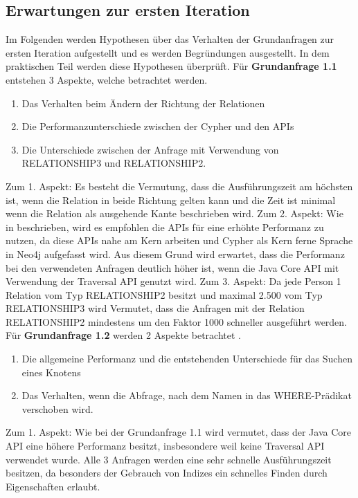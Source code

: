 \subsection{Erwartungen zur ersten Iteration}
Im Folgenden werden Hypothesen über das Verhalten der Grundanfragen zur ersten Iteration aufgestellt und es werden  Begründungen ausgestellt. In dem praktischen Teil werden diese Hypothesen überprüft. \newline \newline
Für \textbf{Grundanfrage 1.1} entstehen 3 Aspekte, welche betrachtet werden.
\begin{enumerate}
\item Das Verhalten beim Ändern der Richtung der Relationen
\item Die Performanzunterschiede zwischen der Cypher und den APIs
\item Die Unterschiede zwischen der Anfrage mit Verwendung von RELATIONSHIP3 und RELATIONSHIP2.
\end{enumerate}
Zum 1. Aspekt: Es besteht die Vermutung, dass die Ausführungszeit am höchsten ist, wenn die Relation in beide Richtung gelten kann und die Zeit ist minimal wenn die Relation als ausgehende Kante beschrieben wird. \newline
 Zum 2. Aspekt: Wie in \parencite{raj2015neo4j} beschrieben, wird es empfohlen die APIs für eine erhöhte Performanz zu nutzen, da diese APIs nahe am Kern arbeiten und Cypher als Kern ferne Sprache in Neo4j aufgefasst wird. Aus diesem Grund wird erwartet, dass die Performanz bei den verwendeten Anfragen deutlich höher ist, wenn die Java Core API mit Verwendung der Traversal API genutzt wird. \newline
Zum 3. Aspekt: Da jede Person 1 Relation vom Typ RELATIONSHIP2 besitzt und maximal 2.500 vom Typ RELATIONSHIP3 wird Vermutet, dass die Anfragen mit der Relation RELATIONSHIP2 mindestens um den Faktor 1000 schneller ausgeführt werden. \newline \newline
Für \textbf{Grundanfrage 1.2} werden 2 Aspekte betrachtet .
\begin{enumerate}
	\item Die allgemeine Performanz und die entstehenden Unterschiede für das Suchen eines Knotens
	\item Das Verhalten, wenn die Abfrage, nach dem Namen in das WHERE-Prädikat verschoben wird.
\end{enumerate}
Zum 1. Aspekt: Wie bei der Grundanfrage 1.1 wird vermutet, dass der Java Core API eine höhere Performanz besitzt, insbesondere weil keine Traversal API verwendet wurde. Alle 3 Anfragen werden eine sehr schnelle Ausführungszeit besitzen, da besonders der Gebrauch von Indizes ein schnelles Finden durch Eigenschaften erlaubt. \newline
